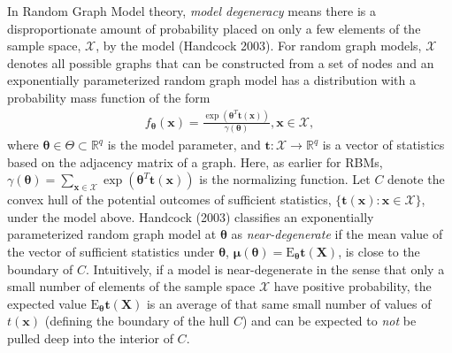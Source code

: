 \documentclass[AMS,STIX1COL]{WileyNJD-v2}
\begin{document}
In Random Graph Model theory, \emph{model degeneracy} means there is a
disproportionate amount of probability placed on only a few elements of
the sample space, \(\mathcal{X}\), by the model (Handcock 2003). For
random graph models, \(\mathcal{X}\) denotes all possible graphs that
can be constructed from a set of nodes and an exponentially
parameterized random graph model has a distribution with a probability
mass function of the form \begin{align*}
f_{\boldsymbol \theta} (\boldsymbol x) = \frac{\exp\left(\boldsymbol \theta^T \boldsymbol t(\boldsymbol x)\right)}{\gamma(\boldsymbol \theta)}, \boldsymbol x \in \mathcal{X},
\end{align*} where
\(\boldsymbol \theta \in \Theta \subset \mathbb{R}^q\) is the model
parameter, and \(\boldsymbol t: \mathcal{X} \rightarrow \mathbb{R}^q\)
is a vector of statistics based on the adjacency matrix of a graph.
Here, as earlier for RBMs,
\(\gamma(\boldsymbol \theta) = \sum_{\boldsymbol x \in \mathcal{X}} \exp\left(\boldsymbol \theta^T \boldsymbol t(\boldsymbol x)\right)\)
is the normalizing function. Let \(C\) denote the convex hull of the
potential outcomes of sufficient statistics,
\(\{\boldsymbol t(\boldsymbol x): \boldsymbol x \in \mathcal{X}\}\),
under the model above. Handcock (2003) classifies an exponentially
parameterized random graph model at \(\boldsymbol \theta\) as
\emph{near-degenerate} if the mean value of the vector of sufficient
statistics under \(\boldsymbol \theta\),
\(\boldsymbol \mu(\boldsymbol \theta) = \text{E}_{\boldsymbol \theta}\boldsymbol t( \boldsymbol X)\),
is close to the boundary of \(C\). Intuitively, if a model is
near-degenerate in the sense that only a small number of elements of the
sample space \(\mathcal{X}\) have positive probability, the expected
value \(\text{E}_{\boldsymbol \theta}\boldsymbol t( \boldsymbol X)\) is
an average of that same small number of values of \(t( \boldsymbol x)\)
(defining the boundary of the hull \(C\)) and can be expected to
\emph{not} be pulled deep into the interior of \(C\).
\end{document}
